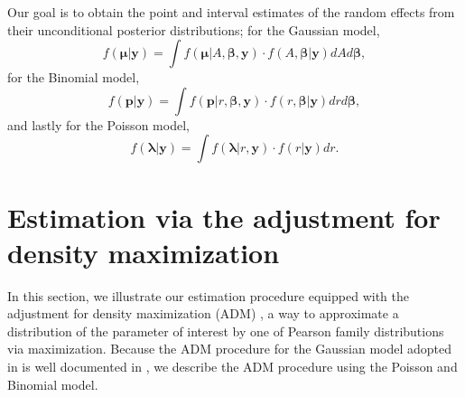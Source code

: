 \documentclass[article]{jss}
\begin{document}
Our goal is to obtain the point and interval estimates of the random effects from their unconditional posterior distributions; for the Gaussian  model, 
\begin{equation}\label{mcintegration_normal}
f(\boldsymbol{\mu}\vert \boldsymbol{y})=\int  f(\boldsymbol{\mu}\vert A, \boldsymbol{\beta}, \boldsymbol{y})\cdot f(A, \boldsymbol{\beta}\vert \boldsymbol{y})dA d\boldsymbol{\beta},
\end{equation}
for the Binomial  model, 
\begin{equation}\label{mcintegration_binomial}
f(\boldsymbol{p}\vert \boldsymbol{y})=\int  f(\boldsymbol{p}\vert r, \boldsymbol{\beta}, \boldsymbol{y})\cdot f(r, \boldsymbol{\beta}\vert \boldsymbol{y})dr d\boldsymbol{\beta},
\end{equation}
and lastly for the Poisson  model, 
\begin{equation}\label{mcintegration_poisson}
f(\boldsymbol{\lambda}\vert \boldsymbol{y})=\int  f(\boldsymbol{\lambda}\vert r, \boldsymbol{y})\cdot f(r\vert \boldsymbol{y})dr.
\end{equation}



\section[Estimation]{Estimation via the adjustment for density maximization}\label{sec3}




In this section, we illustrate our estimation procedure equipped with the adjustment for density maximization (ADM) \citep{carl1988, morris1997, tang2011}, a way to  approximate a distribution of the parameter of interest by one of Pearson family distributions via maximization. Because the ADM procedure for the Gaussian model adopted in  is well documented in \cite{kelly2014advances}, we describe  the ADM procedure  using the Poisson and Binomial model. 
\end{document}
